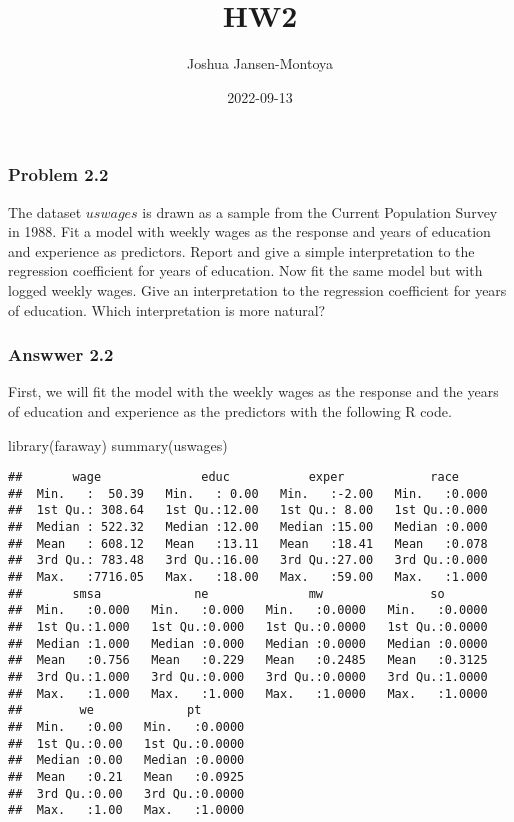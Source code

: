 \documentclass[
]{article}
\title{HW2}
\author{Joshua Jansen-Montoya}
\date{2022-09-13}
\newenvironment{Shaded}{\begin{snugshade}}{\end{snugshade}}
\newcommand{\FunctionTok}[1]{\textcolor[rgb]{0.00,0.00,0.00}{#1}}
\newcommand{\NormalTok}[1]{#1}
\begin{document}
\maketitle

\hypertarget{problem-2.2}{%
\subsubsection{Problem 2.2}\label{problem-2.2}}

The dataset \(uswages\) is drawn as a sample from the Current Population
Survey in 1988. Fit a model with weekly wages as the response and years
of education and experience as predictors. Report and give a simple
interpretation to the regression coefficient for years of education. Now
fit the same model but with logged weekly wages. Give an interpretation
to the regression coefficient for years of education. Which
interpretation is more natural?

\hypertarget{answwer-2.2}{%
\subsubsection{Answwer 2.2}\label{answwer-2.2}}

First, we will fit the model with the weekly wages as the response and
the years of education and experience as the predictors with the
following R code.

\begin{Shaded}
\begin{Highlighting}[]
  \FunctionTok{library}\NormalTok{(faraway)}
  \FunctionTok{summary}\NormalTok{(uswages)}
\end{Highlighting}
\end{Shaded}

\begin{verbatim}
##       wage              educ           exper            race      
##  Min.   :  50.39   Min.   : 0.00   Min.   :-2.00   Min.   :0.000  
##  1st Qu.: 308.64   1st Qu.:12.00   1st Qu.: 8.00   1st Qu.:0.000  
##  Median : 522.32   Median :12.00   Median :15.00   Median :0.000  
##  Mean   : 608.12   Mean   :13.11   Mean   :18.41   Mean   :0.078  
##  3rd Qu.: 783.48   3rd Qu.:16.00   3rd Qu.:27.00   3rd Qu.:0.000  
##  Max.   :7716.05   Max.   :18.00   Max.   :59.00   Max.   :1.000  
##       smsa             ne              mw               so        
##  Min.   :0.000   Min.   :0.000   Min.   :0.0000   Min.   :0.0000  
##  1st Qu.:1.000   1st Qu.:0.000   1st Qu.:0.0000   1st Qu.:0.0000  
##  Median :1.000   Median :0.000   Median :0.0000   Median :0.0000  
##  Mean   :0.756   Mean   :0.229   Mean   :0.2485   Mean   :0.3125  
##  3rd Qu.:1.000   3rd Qu.:0.000   3rd Qu.:0.0000   3rd Qu.:1.0000  
##  Max.   :1.000   Max.   :1.000   Max.   :1.0000   Max.   :1.0000  
##        we             pt        
##  Min.   :0.00   Min.   :0.0000  
##  1st Qu.:0.00   1st Qu.:0.0000  
##  Median :0.00   Median :0.0000  
##  Mean   :0.21   Mean   :0.0925  
##  3rd Qu.:0.00   3rd Qu.:0.0000  
##  Max.   :1.00   Max.   :1.0000
\end{verbatim}
\end{document}
